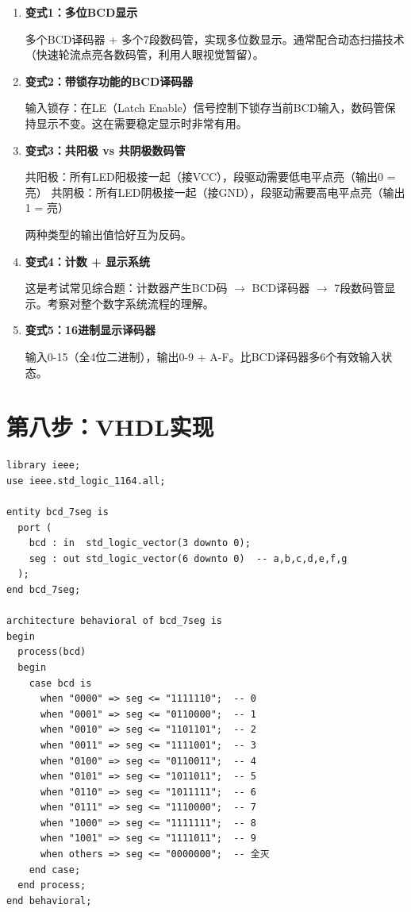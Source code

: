 \begin{enumerate}
  \item \textbf{变式1：多位BCD显示}

  多个BCD译码器 + 多个7段数码管，实现多位数显示。通常配合动态扫描技术（快速轮流点亮各数码管，利用人眼视觉暂留）。

  \item \textbf{变式2：带锁存功能的BCD译码器}

  输入锁存：在LE（Latch Enable）信号控制下锁存当前BCD输入，数码管保持显示不变。这在需要稳定显示时非常有用。

  \item \textbf{变式3：共阳极 vs 共阴极数码管}

  共阳极：所有LED阳极接一起（接VCC），段驱动需要低电平点亮（输出0 = 亮）
  共阴极：所有LED阴极接一起（接GND），段驱动需要高电平点亮（输出1 = 亮）

  两种类型的输出值恰好互为反码。

  \item \textbf{变式4：计数 + 显示系统}

  这是考试常见综合题：计数器产生BCD码 $\to$ BCD译码器 $\to$ 7段数码管显示。考察对整个数字系统流程的理解。

  \item \textbf{变式5：16进制显示译码器}

  输入0-15（全4位二进制），输出0-9 + A-F。比BCD译码器多6个有效输入状态。
\end{enumerate}

\section{第八步：VHDL实现}

\begin{lstlisting}[caption={BCD-7段译码器（case版本）}]
library ieee;
use ieee.std_logic_1164.all;

entity bcd_7seg is
  port (
    bcd : in  std_logic_vector(3 downto 0);
    seg : out std_logic_vector(6 downto 0)  -- a,b,c,d,e,f,g
  );
end bcd_7seg;

architecture behavioral of bcd_7seg is
begin
  process(bcd)
  begin
    case bcd is
      when "0000" => seg <= "1111110";  -- 0
      when "0001" => seg <= "0110000";  -- 1
      when "0010" => seg <= "1101101";  -- 2
      when "0011" => seg <= "1111001";  -- 3
      when "0100" => seg <= "0110011";  -- 4
      when "0101" => seg <= "1011011";  -- 5
      when "0110" => seg <= "1011111";  -- 6
      when "0111" => seg <= "1110000";  -- 7
      when "1000" => seg <= "1111111";  -- 8
      when "1001" => seg <= "1111011";  -- 9
      when others => seg <= "0000000";  -- 全灭
    end case;
  end process;
end behavioral;
\end{lstlisting}

